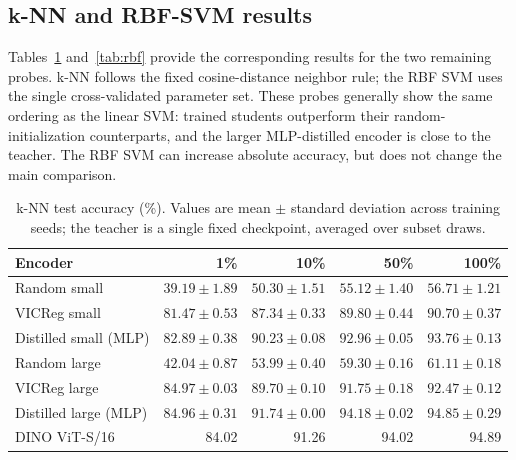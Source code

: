 \documentclass[10pt]{article}
\begin{document}
\subsection{k-NN and RBF-SVM results}

Tables~\ref{tab:knn} and~\ref{tab:rbf} provide the corresponding results
for the two remaining probes. k-NN follows the fixed cosine-distance
neighbor rule; the RBF SVM uses the single cross-validated parameter set.
These probes generally show the same ordering as the linear SVM: trained
students outperform their random-initialization counterparts, and the
larger MLP-distilled encoder is close to the teacher. The RBF SVM can
increase absolute accuracy, but does not change the main comparison.

\begin{table}[H]
\centering
\caption{k-NN test accuracy (\%). Values are mean $\pm$ standard deviation
across training seeds; the teacher is a single fixed checkpoint, averaged
over subset draws.}
\label{tab:knn}
\scriptsize
\setlength{\tabcolsep}{4pt}
\begin{tabular}{lrrrr}
\toprule
Encoder & 1\% & 10\% & 50\% & 100\% \\
\midrule
Random small & $39.19\pm1.89$ & $50.30\pm1.51$ & $55.12\pm1.40$ & $56.71\pm1.21$ \\
VICReg small & $81.47\pm0.53$ & $87.34\pm0.33$ & $89.80\pm0.44$ & $90.70\pm0.37$ \\
Distilled small (MLP) & $82.89\pm0.38$ & $90.23\pm0.08$ & $92.96\pm0.05$ & $93.76\pm0.13$ \\
Random large & $42.04\pm0.87$ & $53.99\pm0.40$ & $59.30\pm0.16$ & $61.11\pm0.18$ \\
VICReg large & $84.97\pm0.03$ & $89.70\pm0.10$ & $91.75\pm0.18$ & $92.47\pm0.12$ \\
Distilled large (MLP) & $84.96\pm0.31$ & $91.74\pm0.00$ & $94.18\pm0.02$ & $94.85\pm0.29$ \\
DINO ViT-S/16 & 84.02 & 91.26 & 94.02 & 94.89 \\
\bottomrule
\end{tabular}
\end{table}
\end{document}
